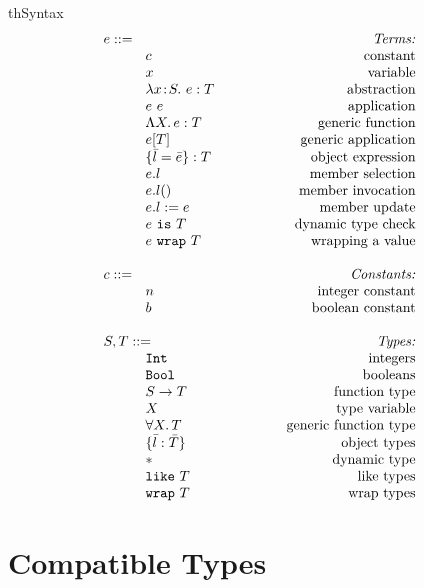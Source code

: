 \documentclass{article}
\newcommand{\mkrefl}[3]{\t{ref}^{#3}~{#1}~#2}
\newcommand{\derefl}[2]{!^{#2}{#1}}
\newcommand{\assignl}[3]{{#1}:=^{#3}{#2}}
\newcommand{\Ref}[1]{\t{Ref}~{#1}}
\newcommand{\lam}[4]{\lambda#1\!:\!#2.\,\,#4:#3}
\newcommand{\lamt}[2]{#1\rightarrow #2}
\newcommand{\app}[2]{#1~#2}
\newcommand{\Int}{\t{Int}}
\newcommand{\Bool}{\t{Bool}}
\newcommand{\dynamic}{\t{*}}
\newcommand{\true}{\t{true}}
\newcommand{\false}{\t{false}}
\newcommand{\Lam}[3]{\Lambda #1.\,#2:#3}
\newcommand{\App}[2]{#1[#2]}
\newcommand{\Lamt}[2]{\forall #1.\,#2}
\newcommand{\lett}[4]{\t{letXXX}~{#1}:{#2}={#3}~\t{in}~{#4}}
\newcommand{\cast}[2]{#1~\t{is}~#2}
\renewcommand{\t}[1]{{\tt #1}}
\newcommand{\objty}[1]{\{#1\}}
\newcommand{\obje}[2]{\{#1\}:{#2}}
\newcommand{\objget}[2]{#1.#2}
\newcommand{\objcall}[2]{#1.#2()}
\newcommand{\objset}[3]{#1.#2:=#3}
\newcommand{\wrapty}[1]{\t{wrap}~#1}
\newcommand{\likety}[1]{\t{like}~#1}
\newcommand{\wrap}[2]{#1~\t{wrap}~#2}
\begin{document}
\begin{displayfigure}{th}{\label{fig:syntax}Syntax}
\[
\begin{array}{llr}
	\mydefhead{e ::=\qquad\qquad\qquad\qquad\qquad}{Terms:} 
	\mydefcase{c								}{constant} 
	\mydefcase{x								}{variable} 
	\mydefcase{\lam{x}{S}{T}{e} 				}{abstraction} 
	\mydefcase{\app{e}{e} 					}{application} 
	\mydefcase{\Lam{X}{e}{T}					}{generic function}
	\mydefcase{\App{e}{T}					}{generic application}
	\mydefcase{\obje{\bar{l}=\bar{e}}{T}		}{object expression}
	\mydefcase{\objget{e}{l}					}{member selection}
	\mydefcase{\objcall{e}{l}				}{member invocation}
	\mydefcase{\objset{e}{l}{e}				}{member update}
	\mydefcase{\cast{e}{T}					}{dynamic type check}
	\mydefcase{\wrap{e}{T}					}{wrapping a value}
\\
	\mydefhead{c ::=}{Constants:} 
	\mydefcase{n								}{integer constant} 
	\mydefcase{b								}{boolean constant} 
\\
	\mydefhead{S,T::=}{Types:} 
	\mydefcase{\Int 							}{integers}
	\mydefcase{\Bool							}{booleans}
	\mydefcase{\lamt{S}{T} 					}{function type}
	\mydefcase{X								}{type variable}
	\mydefcase{\Lamt{X}{T}					}{generic function type}
	\mydefcase{\objty{\bar{l}:\bar{T}}	   	}{object types}
	\mydefcase{\dynamic 		    				}{dynamic type}
	\mydefcase{\likety{T}					}{like types}
	\mydefcase{\wrapty{T}					}{wrap types}
\end{array}
\]
\end{displayfigure}


\clearpage
\section{Compatible Types}
\end{document}
